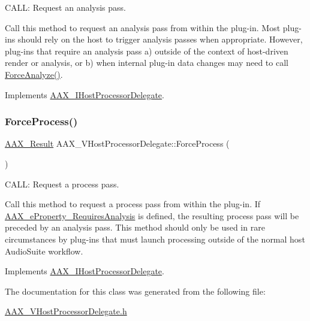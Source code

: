 C\+A\+LL\+: Request an analysis pass. 

Call this method to request an analysis pass from within the plug-\/in. Most plug-\/ins should rely on the host to trigger analysis passes when appropriate. However, plug-\/ins that require an analysis pass a) outside of the context of host-\/driven render or analysis, or b) when internal plug-\/in data changes may need to call {\ttfamily \mbox{\hyperlink{a01921_aeb3eb18f1c9562a31173d600dad9b251}{Force\+Analyze()}}}. 

Implements \mbox{\hyperlink{a01837_a8ab521c8f0902707a8e8d67d7886d4f4}{A\+A\+X\+\_\+\+I\+Host\+Processor\+Delegate}}.

\mbox{\label{a01921_a5e72699c0dafb133a2dfabf63ba8f56a}} 
\subsubsection{\texorpdfstring{ForceProcess()}{ForceProcess()}}
{\footnotesize\ttfamily \mbox{\hyperlink{a00392_a4d8f69a697df7f70c3a8e9b8ee130d2f}{A\+A\+X\+\_\+\+Result}} A\+A\+X\+\_\+\+V\+Host\+Processor\+Delegate\+::\+Force\+Process (\begin{DoxyParamCaption}{ }\end{DoxyParamCaption})\hspace{0.3cm}{\ttfamily [virtual]}}



C\+A\+LL\+: Request a process pass. 

Call this method to request a process pass from within the plug-\/in. If \mbox{\hyperlink{a00662_a13e384f22825afd3db6d68395b79ce0da925c49bb79454b33bf1d5f4cb09d373f}{A\+A\+X\+\_\+e\+Property\+\_\+\+Requires\+Analysis}} is defined, the resulting process pass will be preceded by an analysis pass. This method should only be used in rare circumstances by plug-\/ins that must launch processing outside of the normal host Audio\+Suite workflow. 

Implements \mbox{\hyperlink{a01837_a09793675802a25886bc050cee4b9f843}{A\+A\+X\+\_\+\+I\+Host\+Processor\+Delegate}}.



The documentation for this class was generated from the following file\+:\begin{DoxyCompactItemize}
\item 
\mbox{\hyperlink{a00713}{A\+A\+X\+\_\+\+V\+Host\+Processor\+Delegate.\+h}}\end{DoxyCompactItemize}
